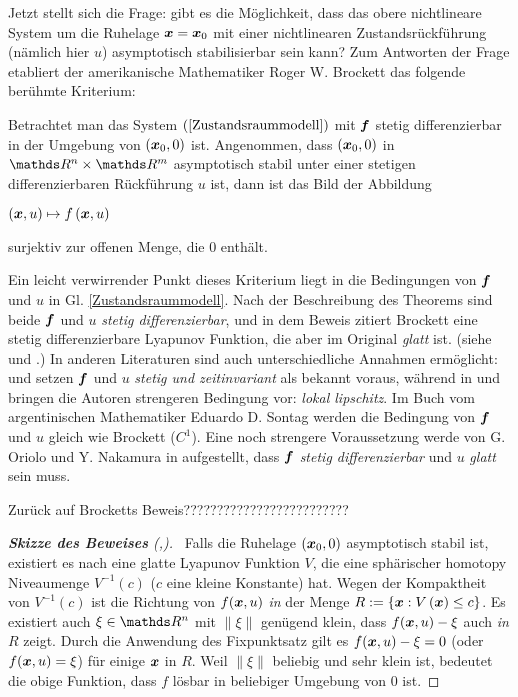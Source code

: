 Jetzt stellt sich die Frage: gibt es die Möglichkeit, dass das obere nichtlineare System um die Ruhelage $\boldsymbol x=\boldsymbol x_{0}$ mit einer nichtlinearen Zustandsrückführung (nämlich hier $u$) asymptotisch stabilisierbar sein kann? Zum Antworten der Frage etabliert der amerikanische Mathematiker Roger W. Brockett das folgende berühmte Kriterium\cite{brockett1983asymptotic}:
\begin{theorem}
Betrachtet man das System $(\ref{Zustandsraummodell})$ mit $\boldsymbol f$ stetig differenzierbar in der Umgebung von $(\boldsymbol x_{0},0)$ ist. Angenommen, dass $(\boldsymbol x_{0},0)$ in $\Reals^{n}\times\Reals^{m}$ asymptotisch stabil unter einer stetigen differenzierbaren Rückführung $u$ ist, dann ist das Bild der Abbildung
\begin{center}$\left ( \boldsymbol x,u \right ) \mapsto f\left ( \boldsymbol x,u \right )$\end{center}
surjektiv zur offenen Menge, die 0 enthält.
\end{theorem}
Ein leicht verwirrender Punkt dieses Kriterium liegt in die Bedingungen von $\boldsymbol f$ und $u$ in Gl. \ref{Zustandsraummodell}. Nach der Beschreibung des Theorems sind beide $\boldsymbol f$ und $u$ \emph{stetig differenzierbar}, und in dem Beweis zitiert Brockett eine stetig differenzierbare Lyapunov Funktion, die aber im Original \emph{glatt} ist. (siehe \cite[S.186]{brockett1983asymptotic} und \cite[S.324]{wilson1967structure}.) In anderen Literaturen sind auch unterschiedliche Annahmen ermöglicht: \cite{coron2007control} und \cite{orsi2003necessary} setzen $\boldsymbol f$ und $u$ \emph{stetig und zeitinvariant} als bekannt voraus, während in \cite{stern2002brockett} und \cite{colonius2012nichtlineare} bringen die Autoren strengeren Bedingung vor: \emph{lokal lipschitz}. Im Buch vom argentinischen Mathematiker Eduardo D. Sontag \cite{sontag2013mathematical} werden die Bedingung von $\boldsymbol f$ und $u$ gleich wie Brockett ($C^{1}$). Eine noch strengere Voraussetzung werde von G. Oriolo und Y. Nakamura in \cite{oriolo1991control} aufgestellt, dass $\boldsymbol f$ \emph{stetig differenzierbar} und $u$ \emph{glatt} sein muss.

Zurück auf Brocketts Beweis?????????????????????????

\begin{proof}[\textbf{Skizze des Beweises} (\cite{brockett1983asymptotic},\cite{liberzon2012switching})]~Falls die Ruhelage $(\boldsymbol x_{0},0)$ asymptotisch stabil ist, existiert es nach \cite{wilson1967structure} eine glatte Lyapunov Funktion $V$, die eine sphärischer homotopy Niveaumenge $V^{-1}(c)$ ($c$ eine kleine Konstante) hat. Wegen der Kompaktheit von $V^{-1}(c)$ ist die Richtung von $f(\boldsymbol x,u)$ \emph{in} der Menge $R:= \left \{ \boldsymbol x:V\left (\boldsymbol x  \right )\leq c \right \}$. Es existiert auch $\xi \in \Reals^{n}$ mit $\left \| \xi \right \|$ genügend klein, dass $f(\boldsymbol x,u)-\xi$ auch \emph{in} $R$ zeigt. Durch die Anwendung des Fixpunktsatz gilt es $f(\boldsymbol x,u)-\xi=0$ (oder $f(\boldsymbol x,u)=\xi$) für einige $\boldsymbol x$ in $R$. Weil $\left \| \xi \right \|$ beliebig und sehr klein ist, bedeutet die obige Funktion, dass $f$ lösbar in beliebiger Umgebung von 0 ist.
\end{proof} %

